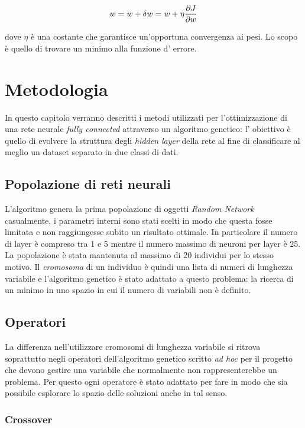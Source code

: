 \documentclass[12pt,a4paper]{report}
\begin{document}
\begin{equation}
 \centering
 w = w + \delta w = w + \eta \frac{\partial J}{\partial w}
\end{equation}

dove $\eta$ è una costante che garantisce un'opportuna convergenza ai pesi. 
Lo scopo è quello di trovare un minimo alla funzione d' errore. \cite{backprop}

\chapter{Metodologia}

In questo capitolo verranno descritti i metodi utilizzati per l'ottimizzazione di una rete neurale \textit{fully connected} attraverso un algoritmo genetico: l' obiettivo è quello di evolvere la struttura degli \textit{hidden layer} della rete al fine di classificare al meglio un dataset separato in due classi di dati.

\section{Popolazione di reti neurali}

L'algoritmo genera la prima popolazione di oggetti \textit{Random Network} casualmente, i parametri interni sono stati scelti in modo che questa fosse limitata e non raggiungesse subito un risultato ottimale.
In particolare il numero di layer è compreso tra 1 e 5 mentre il numero massimo di neuroni per layer è 25.
La popolazione è stata mantenuta al massimo di 20 individui per lo stesso motivo.
Il \textit{cromosoma} di un individuo è quindi una lista di numeri di lunghezza variabile e l'algoritmo genetico è stato adattato a questo problema: la ricerca di un minimo in uno spazio in cui il numero di variabili non è definito.

\section{Operatori}

La differenza nell'utilizzare cromosomi di lunghezza variabile si ritrova soprattutto negli operatori dell'algoritmo genetico scritto \textit{ad hoc} per il progetto che devono gestire una variabile che normalmente non rappresenterebbe un problema. 
Per questo ogni operatore è stato adattato per fare in modo che sia possibile esplorare lo spazio delle soluzioni anche in tal senso.

\subsection{Crossover}
\end{document}

